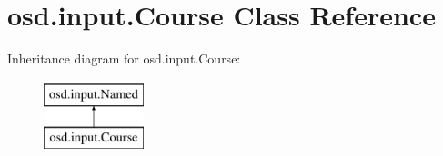 \hypertarget{interfaceosd_1_1input_1_1_course}{\section{osd.\-input.\-Course Class Reference}
\label{interfaceosd_1_1input_1_1_course}
}
Inheritance diagram for osd.\-input.\-Course\-:\begin{figure}[H]
\begin{center}
\leavevmode
\includegraphics[height=2.000000cm]{interfaceosd_1_1input_1_1_course}
\end{center}
\end{figure}
